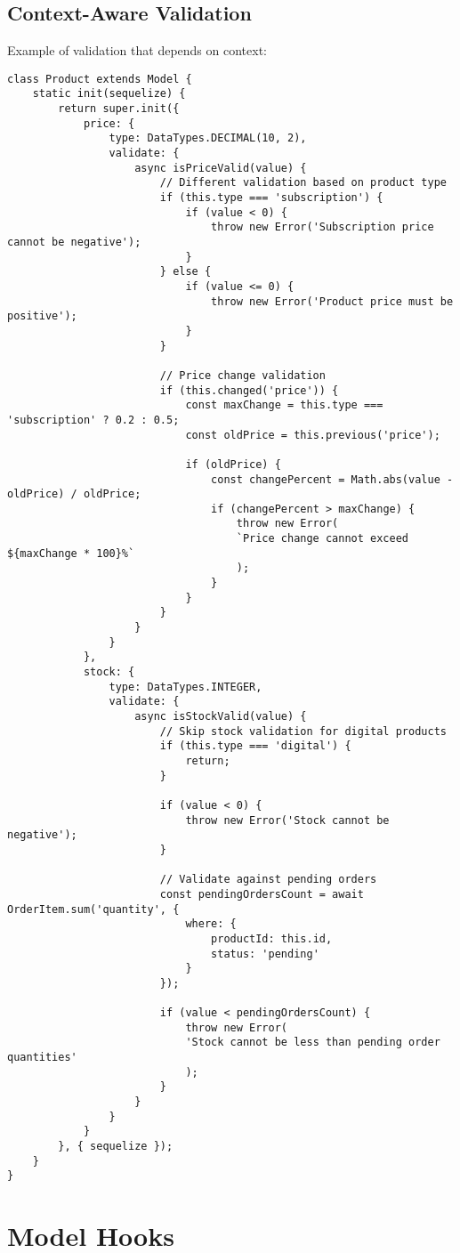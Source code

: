 \documentclass[12pt,a4paper]{book}
\begin{document}
	\subsection{Context-Aware Validation}
	
		Example of validation that depends on context:
		
		\begin{verbatim}
class Product extends Model {
	static init(sequelize) {
		return super.init({
			price: {
				type: DataTypes.DECIMAL(10, 2),
				validate: {
					async isPriceValid(value) {
						// Different validation based on product type
						if (this.type === 'subscription') {
							if (value < 0) {
								throw new Error('Subscription price cannot be negative');
							}
						} else {
							if (value <= 0) {
								throw new Error('Product price must be positive');
							}
						}
						
						// Price change validation
						if (this.changed('price')) {
							const maxChange = this.type === 'subscription' ? 0.2 : 0.5;
							const oldPrice = this.previous('price');
							
							if (oldPrice) {
								const changePercent = Math.abs(value - oldPrice) / oldPrice;
								if (changePercent > maxChange) {
									throw new Error(
									`Price change cannot exceed ${maxChange * 100}%`
									);
								}
							}
						}
					}
				}
			},
			stock: {
				type: DataTypes.INTEGER,
				validate: {
					async isStockValid(value) {
						// Skip stock validation for digital products
						if (this.type === 'digital') {
							return;
						}
						
						if (value < 0) {
							throw new Error('Stock cannot be negative');
						}
						
						// Validate against pending orders
						const pendingOrdersCount = await OrderItem.sum('quantity', {
							where: {
								productId: this.id,
								status: 'pending'
							}
						});
						
						if (value < pendingOrdersCount) {
							throw new Error(
							'Stock cannot be less than pending order quantities'
							);
						}
					}
				}
			}
		}, { sequelize });
	}
}
	\end{verbatim}
	
	
	\section{Model Hooks}
	
\end{document}
